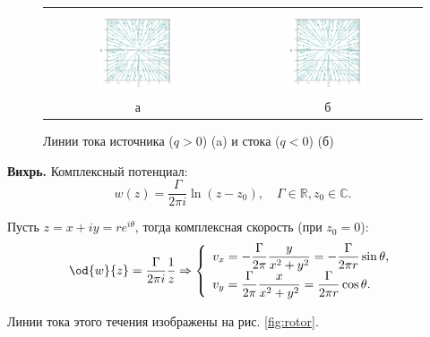 \documentclass[a4paper, 14pt]{extarticle}
\begin{document}
\begin{problems}
\begin{figure}
	\centering
	\begin{tabular}{cc}
	\includegraphics[width=0.45\textwidth]{../img/source.pdf} &
	\includegraphics[width=0.45\textwidth]{../img/sink.pdf} \\
	а & б 
	\end{tabular}
	\caption{Линии тока источника ($q>0$) (a) и стока ($q<0$) (б)}
	\label{fig:source_sink}
\end{figure}

\item
\textbf{Вихрь.} Комплексный потенциал:
\[
	w(z) = \frac{\Gamma}{2\pi i}\ln(z-z_0),\quad
	\Gamma \in\mathbb{R}, z_0\in\mathbb{C}.
\]
			
Пусть $z=x+iy=re^{i\theta}$, тогда комплексная скорость (при $z_0=0$):
\[
	\od{w}{z} = \frac{\Gamma}{2\pi i}\frac{1}{z} \Rightarrow 
	\left\{
	\begin{array}{l}
		\displaystyle	v_x = -\frac{\Gamma}{2\pi}\frac{y}{x^2+y^2} = -\frac{\Gamma}{2\pi r}\sin\theta,\\
		\displaystyle	v_y = \frac{\Gamma}{2\pi}\frac{x}{x^2+y^2} = \frac{\Gamma}{2\pi r}\cos\theta.
	\end{array}
	\right.
\]

Линии тока этого течения изображены на рис. \ref{fig:rotor}.


\end{problems}
\end{document}
